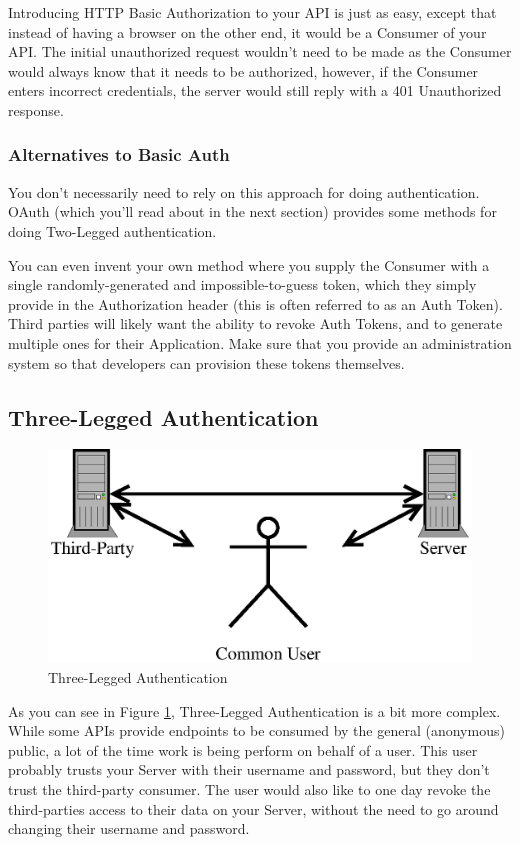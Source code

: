 \documentclass{book}
\begin{document}
Introducing HTTP Basic Authorization to your API is just as easy, except that instead of having a browser on the other end, it would be a Consumer of your API. The initial unauthorized request wouldn't need to be made as the Consumer would always know that it needs to be authorized, however, if the Consumer enters incorrect credentials, the server would still reply with a 401 Unauthorized response.

\subsubsection{Alternatives to Basic Auth}

You don't necessarily need to rely on this approach for doing authentication. OAuth (which you'll read about in the next section) provides some methods for doing Two-Legged authentication.

You can even invent your own method where you supply the Consumer with a single randomly-generated and impossible-to-guess token, which they simply provide in the Authorization header (this is often referred to as an Auth Token). Third parties will likely want the ability to revoke Auth Tokens, and to generate multiple ones for their Application. Make sure that you provide an administration system so that developers can provision these tokens themselves.

\subsection{Three-Legged Authentication}

\begin{figure}[!htb]
\centering
\includegraphics[scale=.6]{images/three-legged.eps}
\caption{Three-Legged Authentication}
\label{fig:threelegged}
\end{figure}

As you can see in Figure \ref{fig:threelegged}, Three-Legged Authentication is a bit more complex. While some APIs provide endpoints to be consumed by the general (anonymous) public, a lot of the time work is being perform on behalf of a user. This user probably trusts your Server with their username and password, but they don't trust the third-party consumer. The user would also like to one day revoke the third-parties access to their data on your Server, without the need to go around changing their username and password.
\end{document}
